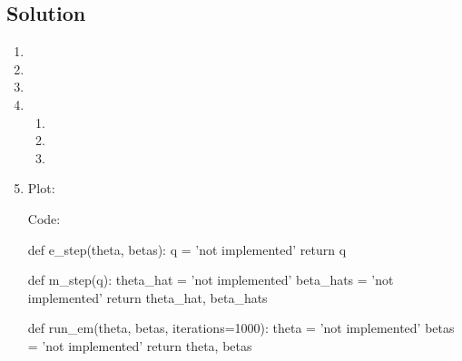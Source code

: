\documentclass[submit]{harvardml}
\begin{document}
\newpage
\subsection*{Solution}

\begin{enumerate}
  \item
  \item 
  \item 
  \item 
    \begin{enumerate}
      \item 
      \item 
      \item 
    \end{enumerate}
  \item 
    Plot:

    Code:

    \begin{python}
def e_step(theta, betas):
    q = 'not implemented'
    return q


def m_step(q):
    theta_hat = 'not implemented'
    beta_hats = 'not implemented'
    return theta_hat, beta_hats


def run_em(theta, betas, iterations=1000):
    theta = 'not implemented'
    betas = 'not implemented'
    return theta, betas
    \end{python}
\end{enumerate}


\newpage
\end{document}
